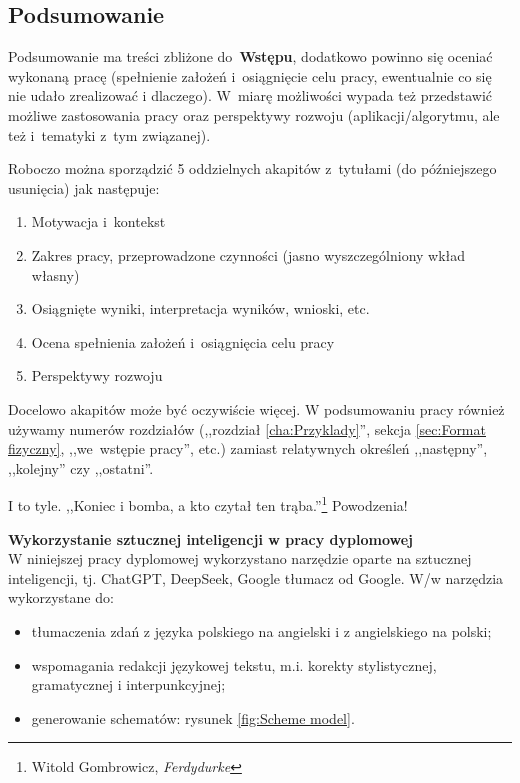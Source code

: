 \documentclass{iiuwb}
\begin{document}
\begin{itemize}
\cleardoublepage
\chapter*{Podsumowanie}
\label{cha:Podsumowanie}

Podsumowanie ma treści zbliżone do~\textbf{Wstępu}, dodatkowo powinno się oceniać wykonaną pracę (spełnienie założeń i~osiągnięcie celu pracy, ewentualnie co się nie udało zrealizować i dlaczego). W~miarę możliwości wypada też przedstawić możliwe zastosowania pracy oraz perspektywy rozwoju (aplikacji/algorytmu, ale też i~tematyki z~tym związanej).

Roboczo można sporządzić 5 oddzielnych akapitów z~tytułami (do późniejszego usunięcia) jak następuje:
\begin{enumerate}
  \item Motywacja i~kontekst
        \vspace{-10pt}
  \item Zakres pracy, przeprowadzone czynności (jasno wyszczególniony wkład własny)
        \vspace{-10pt}
  \item Osiągnięte wyniki, interpretacja wyników, wnioski, etc.
        \vspace{-10pt}
  \item Ocena spełnienia założeń i~osiągnięcia celu pracy
        \vspace{-10pt}
  \item Perspektywy rozwoju
\end{enumerate}

Docelowo akapitów może być oczywiście więcej.
W podsumowaniu pracy również używamy numerów rozdziałów (,,rozdział \ref{cha:Przyklady}'', sekcja \ref{sec:Format fizyczny}, ,,we~wstępie pracy'', etc.) zamiast relatywnych określeń ,,następny'', ,,kolejny'' czy ,,ostatni''.

I to tyle. ,,Koniec i bomba, a kto czytał ten trąba.''\footnote{Witold Gombrowicz, \textit{Ferdydurke}} Powodzenia!


\newpage
\textbf{\large{Wykorzystanie sztucznej inteligencji w pracy dyplomowej}}
\\
W niniejszej pracy dyplomowej wykorzystano narzędzie oparte na sztucznej inteligencji, tj. ChatGPT, DeepSeek, Google tłumacz od Google. W/w narzędzia wykorzystane do:
\begin{itemize}
    \item tłumaczenia zdań z języka polskiego na angielski i z angielskiego na polski;
    \item wspomagania redakcji językowej tekstu, m.i. korekty stylistycznej, gramatycznej i interpunkcyjnej;
    \item generowanie schematów: rysunek \ref{fig:Scheme model}.
\end{itemize}



\end{itemize}
\end{document}
